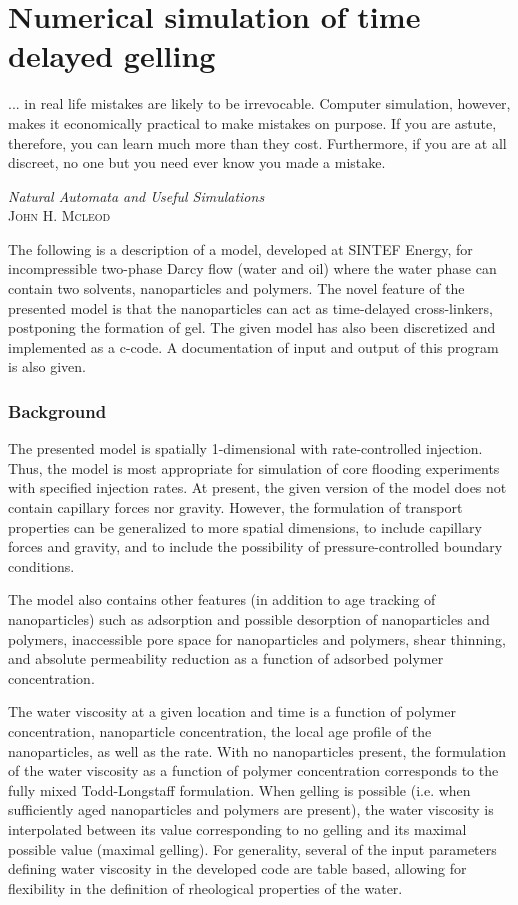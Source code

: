 \chapter{Numerical simulation of time delayed gelling } \label{chap:simulation}
\vspace*{\fill}
\epigraph{... in real life mistakes are likely to be irrevocable. Computer simulation, however, makes it economically practical to make mistakes on purpose. If you are astute, therefore, you can learn much more than they cost. Furthermore, if you are at all discreet, no one but you need ever know you made a mistake.}%
{\textit{Natural Automata and Useful Simulations}\\ \textsc{John H. Mcleod}}
\clearpage{\thispagestyle{empty}\cleardoublepage}

The following is a description of a model, developed at SINTEF Energy, for incompressible two-phase Darcy flow (water and oil) where the water phase can contain two solvents, nanoparticles and polymers. The novel feature of the presented model is that the nanoparticles can act as time-delayed cross-linkers, postponing the formation of gel. The given model has also been discretized and implemented as a c-code. A documentation of input and output of this program is also given.

\subsection{Background}
The presented model is spatially 1-dimensional with rate-controlled injection. Thus, the model is most appropriate for simulation of core flooding experiments with specified injection rates. At present, the given version of the model does not contain capillary forces nor gravity. However, the formulation of transport properties can be generalized to more spatial dimensions, to include capillary forces and gravity, and to include the possibility of pressure-controlled boundary conditions. 

The model also contains other features (in addition to age tracking of nanoparticles) such as adsorption and possible desorption of nanoparticles and polymers, inaccessible pore space for nanoparticles and polymers, shear thinning, and absolute permeability reduction as a function of adsorbed polymer concentration. 

The water viscosity at a given location and time is a function of polymer concentration, nanoparticle concentration, the local age profile of the nanoparticles, as well as the rate. With no nanoparticles present, the formulation of the water viscosity as a function of polymer concentration corresponds to the fully mixed Todd-Longstaff formulation. When gelling is possible (i.e. when sufficiently aged nanoparticles and polymers are present), the water viscosity is interpolated between its value corresponding to no gelling and its maximal possible value (maximal gelling).  For generality, several of the input parameters defining water viscosity in the developed code are table based, allowing for flexibility in the definition of rheological properties of the water.

